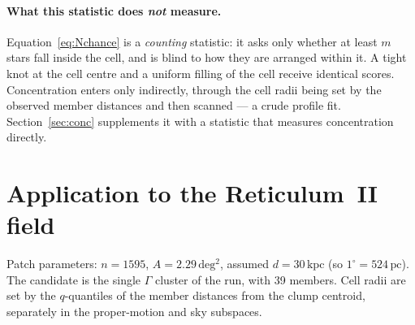 \documentclass[11pt,a4paper]{article}
\newcommand{\unit}[1]{\ensuremath{\,\mathrm{#1}}}
\newcommand{\degsq}{\unit{deg^2}}
\begin{document}
\paragraph{What this statistic does \emph{not} measure.}
Equation~\eqref{eq:Nchance} is a \emph{counting} statistic: it asks only whether
at least $m$ stars fall inside the cell, and is blind to how they are arranged
within it. A tight knot at the cell centre and a uniform filling of the cell
receive identical scores. Concentration enters only indirectly, through the cell
radii being set by the observed member distances and then scanned --- a crude
profile fit. Section~\ref{sec:conc} supplements it with a statistic that measures
concentration directly.

\section{Application to the Reticulum~II field}

Patch parameters: $n=1595$, $A=2.29\degsq$, assumed $d=30\unit{kpc}$
(so $1^\circ=524\unit{pc}$). The candidate is the single $\Gamma$ cluster of
the run, with 39 members. Cell radii are set by the $q$-quantiles of the member
distances from the clump centroid, separately in the proper-motion and sky
subspaces.
\end{document}
